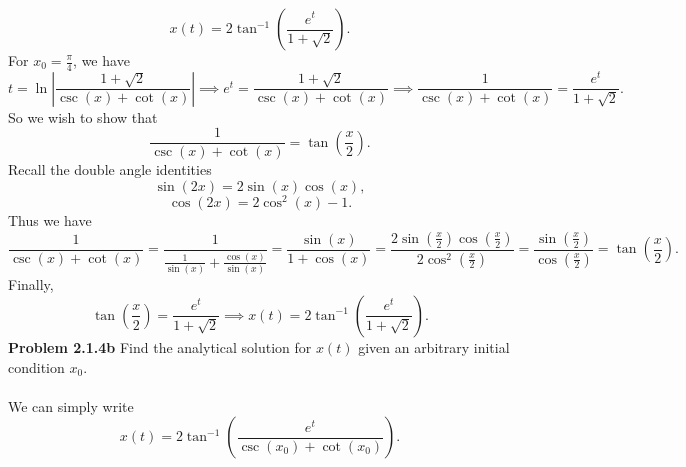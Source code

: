 \documentclass[fleqn]{article}
\begin{document}
\[
x(t)=2\tan^{-1}\left(\frac{e^t}{1+\sqrt{2}}\right).
\]
For $x_0=\frac{\pi}{4}$, we have
\[
t=\ln\left|\frac{1+\sqrt{2}}{\csc(x)+\cot(x)}\right|\implies e^t=\frac{1+\sqrt{2}}{\csc(x)+\cot(x)}\implies\frac{1}{\csc(x)+\cot(x)}=\frac{e^t}{1+\sqrt{2}}.
\]
So we wish to show that
\[
\frac{1}{\csc(x)+\cot(x)}=\tan(\frac{x}{2}).
\]
Recall the double angle identities
\[
\sin(2x)=2\sin(x)\cos(x),
\]
\[
\cos(2x)=2\cos^2(x)-1.
\]
Thus we have
\[
\frac{1}{\csc(x)+\cot(x)}=\frac{1}{\frac{1}{\sin(x)}+\frac{\cos(x)}{\sin(x)}}=\frac{\sin(x)}{1+\cos(x)}=\frac{2\sin(\frac{x}{2})\cos(\frac{x}{2})}{2\cos^2(\frac{x}{2})}=\frac{\sin(\frac{x}{2})}{\cos(\frac{x}{2})}=\tan(\frac{x}{2}).
\]
Finally,
\[
\tan(\frac{x}{2})=\frac{e^t}{1+\sqrt{2}}\implies x(t)=2\tan^{-1}\left(\frac{e^t}{1+\sqrt{2}}\right).
\]
\textbf{Problem 2.1.4b} Find the analytical solution for $x(t)$ given an arbitrary initial condition $x_0$.
\\\\
We can simply write
\[
x(t)=2\tan^{-1}\left(\frac{e^t}{\csc(x_0)+\cot(x_0)}\right).
\]
\end{document}
